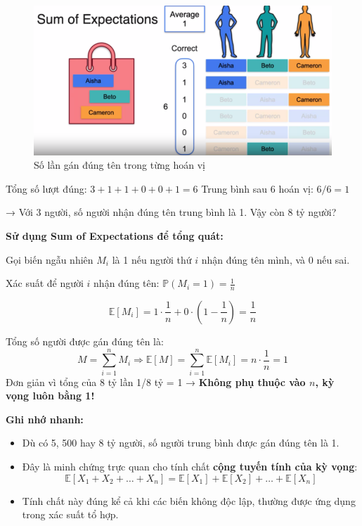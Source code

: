 \documentclass[11pt]{article}
\begin{document}
\begin{figure}[H]
    \centering
    \includegraphics[width=0.9\linewidth]{images/sum_expectation_names.png}
    \caption{Số lần gán đúng tên trong từng hoán vị}
\end{figure}

Tổng số lượt đúng: $3 + 1 + 1 + 0 + 0 + 1 = 6$  
Trung bình sau 6 hoán vị: $6 / 6 = 1$

→ Với 3 người, số người nhận đúng tên trung bình là 1. Vậy còn 8 tỷ người?

\vspace{1em}

\textbf{Sử dụng Sum of Expectations để tổng quát:}

Gọi biến ngẫu nhiên $M_i$ là 1 nếu người thứ $i$ nhận đúng tên mình, và $0$ nếu sai.

Xác suất để người $i$ nhận đúng tên: $\mathbb{P}(M_i = 1) = \frac{1}{n}$

\[
\mathbb{E}[M_i] = 1 \cdot \frac{1}{n} + 0 \cdot \left(1 - \frac{1}{n}\right) = \frac{1}{n}
\]

Tổng số người được gán đúng tên là:
\[
M = \sum_{i=1}^n M_i
\Rightarrow \mathbb{E}[M] = \sum_{i=1}^n \mathbb{E}[M_i] = n \cdot \frac{1}{n} = 1
\]
Đơn giản vì tổng của 8 tỷ lần 1/8 tỷ = 1
→ \textbf{Không phụ thuộc vào $n$, kỳ vọng luôn bằng 1!} 

\vspace{0.5em}

\begin{summarybox}
    \textbf{Ghi nhớ nhanh:}
    \begin{itemize}
        \item Dù có 5, 500 hay 8 tỷ người, số người trung bình được gán đúng tên là 1.
        \item Đây là minh chứng trực quan cho tính chất \textbf{cộng tuyến tính của kỳ vọng}:
        \[
        \mathbb{E}[X_1 + X_2 + \ldots + X_n] = \mathbb{E}[X_1] + \mathbb{E}[X_2] + \ldots + \mathbb{E}[X_n]
        \]
        \item Tính chất này đúng kể cả khi các biến không độc lập, thường được ứng dụng trong xác suất tổ hợp.
    \end{itemize}
\end{summarybox}
\end{document}
